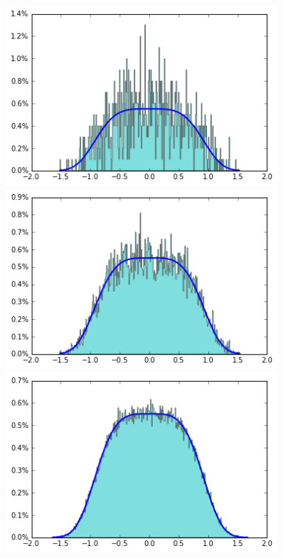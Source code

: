 \documentclass[final]{beamer}
\newlength{\sepwid}
\newlength{\onecolwid}
\begin{document}
\begin{frame}[t]
\begin{columns}[t]
\begin{column}{\onecolwid}

\end{column} %

\begin{column}{\sepwid}\end{column} %

\begin{column}{\onecolwid} %


\begin{figure}
    \centering
    \includegraphics[width=.33\onecolwid]{../figure/case1_step_0.005_iter_1e3.png}
    \includegraphics[width=.33\onecolwid]{../figure/case1_step_0.005_iter_1e4.png}
    \includegraphics[width=.33\onecolwid]{../figure/case1_step_0.005_iter_1e5.png}\\

\end{figure}
\end{column}
\end{columns}
\end{frame}
\end{document}
